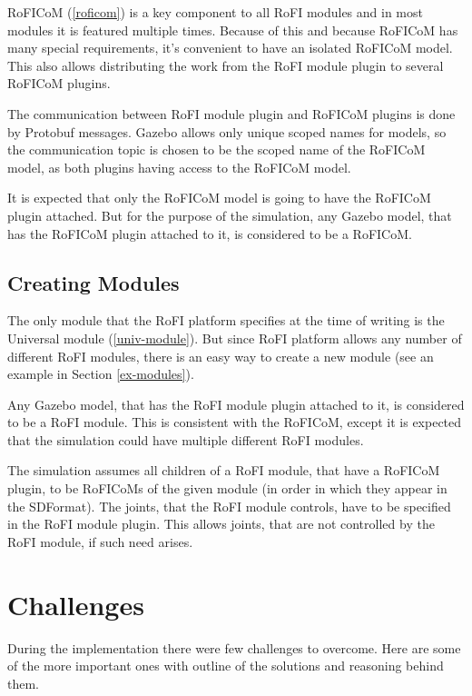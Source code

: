 \documentclass[
  digital, %
  table,   %
  oneside, %
  nolof,     %
  nolot,     %
]{fithesis3}
\begin{document}
RoFICoM (\ref{roficom}) is a key component to all RoFI modules and in most modules it is featured multiple times.
Because of this and because RoFICoM has many special requirements, it's convenient to have an isolated RoFICoM model.
This also allows distributing the work from the RoFI module plugin to several RoFICoM plugins.

The communication between RoFI module plugin and RoFICoM plugins is done by Protobuf messages.
Gazebo allows only unique scoped names for models, so the communication topic is chosen to be the scoped name of the RoFICoM model, as both plugins having access to the RoFICoM model.

It is expected that only the RoFICoM model is going to have the RoFICoM plugin attached.
But for the purpose of the simulation, any Gazebo model, that has the RoFICoM plugin attached to it, is considered to be a RoFICoM.

\subsection{Creating Modules}

The only module that the RoFI platform specifies at the time of writing is the Universal module (\ref{univ-module}).
But since RoFI platform allows any number of different RoFI modules, there is an easy way to create a new module (see an example in Section \ref{ex-modules}).

Any Gazebo model, that has the RoFI module plugin attached to it, is considered to be a RoFI module.
This is consistent with the RoFICoM, except it is expected that the simulation could have multiple different RoFI modules.

The simulation assumes all children of a RoFI module, that have a RoFICoM plugin, to be RoFICoMs of the given module (in order in which they appear in the SDFormat).
The joints, that the RoFI module controls, have to be specified in the RoFI module plugin.
This allows joints, that are not controlled by the RoFI module, if such need arises.

\section{Challenges}

During the implementation there were few challenges to overcome.
Here are some of the more important ones with outline of the solutions and reasoning behind them.
\end{document}
